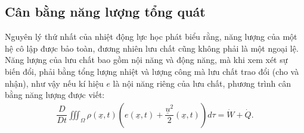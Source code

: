 \documentclass[../../../main.tex]{subfiles}
\begin{document}
\subsection{Cân bằng năng lượng tổng quát}
    Nguyên lý thứ nhất của nhiệt động lực học phát biểu rằng, năng lượng của một hệ cô lập được bảo toàn, đương nhiên lưu chất cũng không phải là một ngoại lệ. Năng lượng của lưu chất bao gồm nội năng và động năng, mà khi xem xét sự biến đổi, phải bằng tổng lượng nhiệt và lượng công mà lưu chất trao đổi (cho và nhận), như vậy nếu kí hiệu $e$ là nội năng riêng của lưu chất, phương trình cân bằng năng lượng được viết:
        \begin{align}
            \dfrac{D}{Dt}\iiint_{\Omega}\rho\left(\underline{x},t\right)\left(e\left(\underline{x},t\right)+\dfrac{\underline{u}^2}{2}\left(\underline{x},t\right)\right)d\tau=\dot{W}+\dot{Q}.
        \end{align}
\end{document}
